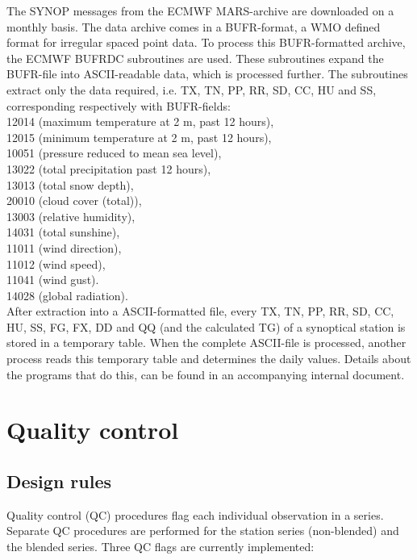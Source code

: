\documentclass[a4paper,11pt]{article}
\begin{document}
The SYNOP messages from the ECMWF MARS-archive are downloaded on a
monthly basis. The data archive comes in a BUFR-format, a WMO defined
format for irregular spaced point data. To process this BUFR-formatted
archive, the ECMWF BUFRDC subroutines are used. These subroutines
expand the BUFR-file into ASCII-readable data, which is processed
further. The subroutines extract only the data required, i.e. TX, TN,
PP, RR, SD, CC, HU and SS, corresponding respectively with BUFR-fields:\\
12014 (maximum temperature at 2 m, past 12 hours),\\
12015 (minimum temperature at 2 m, past 12 hours),\\ 
10051 (pressure reduced to mean sea level),\\
13022 (total precipitation past 12 hours),\\
13013 (total snow depth),\\
20010 (cloud cover (total)),\\
13003 (relative humidity),\\
14031 (total sunshine),\\
11011 (wind direction),\\
11012 (wind speed),\\
11041 (wind gust).\\
14028 (global radiation).\\

After extraction into a ASCII-formatted file, every TX, TN, PP, RR,
SD, CC, HU, SS, FG, FX, DD and QQ (and the calculated TG) of a synoptical
station is stored in a temporary table. When the complete ASCII-file
is processed, another process reads this temporary table and
determines the daily values. Details about the programs that do this,
can be found in an accompanying internal document.





\section{Quality control}
\label{sec:qc}

\subsection{Design rules}
\label{sec:qcrules}

Quality control (QC) procedures flag each individual observation in a
series. Separate QC procedures are performed for the station series
(non-blended) and the blended series.  Three QC flags are currently
implemented:
\end{document}
